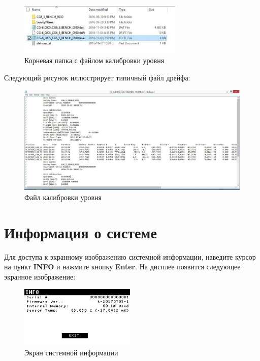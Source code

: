 \begin{figure}[H]
  \centering
  \includegraphics[width=0.7\textwidth]{figures/the_level_calibration_file_under_root_folder}
  \caption{Корневая папка с файлом калибровки уровня}
  \label{fig:the_level_calibration_file_under_root_folder}
\end{figure}

Следующий рисунок иллюстрирует типичный файл дрейфа:

\begin{figure}[H]
  \centering
  \includegraphics[width=\textwidth]{figures/the_level_calibration_file}
  \caption{Файл калибровки уровня}
  \label{fig:the_level_calibration_file}
\end{figure}

\section{Информация о системе}

Для доступа к экранному изображению системной информации, наведите курсор на
пункт \textbf{INFO} и нажмите кнопку \textbf{Enter}. На дисплее появится
следующее экранное изображение:

\begin{figure}[H]
  \centering
  \includegraphics[width=0.49\textwidth]{figures/the_system_information_screen}
  \caption{Экран системной информации}
  \label{fig:the_system_information_screen}
\end{figure}

